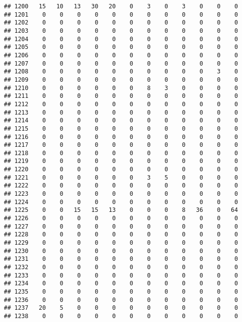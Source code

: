 \documentclass[]{article}
\begin{document}
\begin{verbatim}
## 1200   15   10   13   30   20    0    3    0    3    0    0    0
## 1201    0    0    0    0    0    0    0    0    0    0    0    0
## 1202    0    0    0    0    0    0    0    0    0    0    0    0
## 1203    0    0    0    0    0    0    0    0    0    0    0    0
## 1204    0    0    0    0    0    0    0    0    0    0    0    0
## 1205    0    0    0    0    0    0    0    0    0    0    0    0
## 1206    0    0    0    0    0    0    0    0    0    0    0    0
## 1207    0    0    0    0    0    0    0    0    0    0    0    0
## 1208    0    0    0    0    0    0    0    0    0    0    3    0
## 1209    0    0    0    0    0    0    0    0    0    0    0    0
## 1210    0    0    0    0    0    0    8    3    0    0    0    0
## 1211    0    0    0    0    0    0    0    0    0    0    0    0
## 1212    0    0    0    0    0    0    0    0    0    0    0    0
## 1213    0    0    0    0    0    0    0    0    0    0    0    0
## 1214    0    0    0    0    0    0    0    0    0    0    0    0
## 1215    0    0    0    0    0    0    0    0    0    0    0    0
## 1216    0    0    0    0    0    0    0    0    0    0    0    0
## 1217    0    0    0    0    0    0    0    0    0    0    0    0
## 1218    0    0    0    0    0    0    0    0    0    0    0    0
## 1219    0    0    0    0    0    0    0    0    0    0    0    0
## 1220    0    0    0    0    0    0    0    0    0    0    0    0
## 1221    0    0    0    0    0    0    3    5    0    0    0    0
## 1222    0    0    0    0    0    0    0    0    0    0    0    0
## 1223    0    0    0    0    0    0    0    0    0    0    0    0
## 1224    0    0    0    0    0    0    0    0    0    0    0    0
## 1225    0    0   15   15   13    0    0    0    8   36    0   64
## 1226    0    0    0    0    0    0    0    0    0    0    0    0
## 1227    0    0    0    0    0    0    0    0    0    0    0    0
## 1228    0    0    0    0    0    0    0    0    0    0    0    0
## 1229    0    0    0    0    0    0    0    0    0    0    0    0
## 1230    0    0    0    0    0    0    0    0    0    0    0    0
## 1231    0    0    0    0    0    0    0    0    0    0    0    0
## 1232    0    0    0    0    0    0    0    0    0    0    0    0
## 1233    0    0    0    0    0    0    0    0    0    0    0    0
## 1234    0    0    0    0    0    0    0    0    0    0    0    0
## 1235    0    0    0    0    0    0    0    0    0    0    0    0
## 1236    0    0    0    0    0    0    0    0    0    0    0    0
## 1237   20    5    0    0    0    0    0    0    0    0    0    0
## 1238    0    0    0    0    0    0    0    0    0    0    0    0

\end{verbatim}
\end{document}
